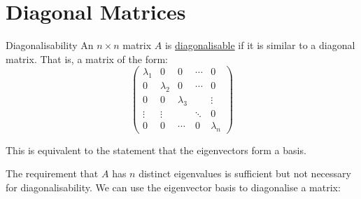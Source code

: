 \documentclass[../Main.tex]{subfiles}
\begin{document}
\section{Diagonal Matrices}
\begin{definition}{Diagonalisability}
An $n \times n$ matrix $A$ is \underline{diagonalisable} if it is similar to a diagonal matrix. That is, a matrix of the form:
    \begin{equation*}
        \begin{pmatrix}
            \lambda_1 & 0 & 0 & \cdots & 0 \\
            0 & \lambda_2 & 0 & \cdots & 0 \\
            0 & 0 & \lambda_3 & & \vdots \\
            \vdots & \vdots & & \ddots & 0 \\
            0 & 0 & \cdots & 0 & \lambda_n
        \end{pmatrix}
    \end{equation*}
\end{definition}
This is equivalent to the statement that the eigenvectors form a basis.\par
The requirement that $A$ has $n$ distinct eigenvalues is sufficient but not necessary for diagonalisability. We can use the eigenvector basis to diagonalise a matrix:
\end{document}
